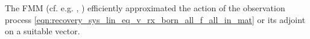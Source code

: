 The \ac{FMM}
(cf. e.g.
\cite[Chapt. 9]{book:Gibson2014},
\cite{article:CoifmanIAPM1993,article:RokhlinJCP1990}%
) efficiently approximated
the action of
the observation process
\eqref{eqn:recovery_sys_lin_eq_v_rx_born_all_f_all_in_mat} or
its adjoint on
a suitable vector.
